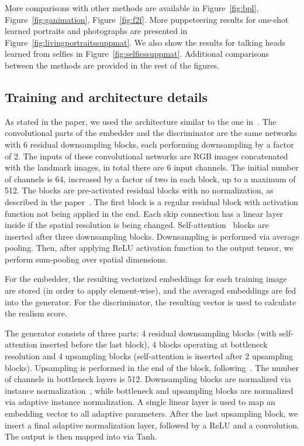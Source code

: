 \documentclass[10pt,twocolumn,letterpaper]{article}
\newcommand{\fig}[1]{Figure~\ref{fig:#1}}
\begin{document}
More comparisons with other methods are available in \fig{bpl}, \fig{ganimation}, \fig{f2f}. More puppeteering results for one-shot learned portraits and photographs are presented in \fig{livingportraitssuppmat}. We also show the results for talking heads learned from selfies in \fig{selfiessuppmat}. Additional comparisons between the methods are provided in the rest of the figures.

\subsection{Training and architecture details}

As stated in the paper, we used the architecture similar to the one in~\cite{Brock18}. The convolutional parts of the embedder and the discriminator are the same networks with 6 residual downsampling blocks, each performing downsampling by a factor of 2. The inputs of these convolutional networks are RGB images concatenated with the landmark images, in total there are 6 input channels. The initial number of channels is 64, increased by a factor of two in each block, up to a maximum of 512. The blocks are pre-activated residual blocks with no normalization, as described in the paper~\cite{Brock18}. The first block is a regular residual block with activation function not being applied in the end. Each skip connection has a linear layer inside if the spatial resolution is being changed. Self-attention~\cite{Zhang18b} blocks are inserted after three downsampling blocks. Downsampling is performed via average pooling. Then, after applying ReLU activation function to the output tensor, we perform sum-pooling over spatial dimensions.

For the embedder, the resulting vectorized embeddings for each training image are stored (in order to apply  element-wise), and the averaged embeddings are fed into the generator. For the discriminator, the resulting vector is used to calculate the realism score.

The generator consists of three parts: 4 residual downsampling blocks (with self-attention inserted before the last block), 4 blocks operating at bottleneck resolution and 4 upsampling blocks (self-attention is inserted after 2 upsampling blocks). Upsampling is performed in the end of the block, following~\cite{Brock18}. The number of channels in bottleneck layers is 512. Downsampling blocks are normalized via instance normalization~\cite{Ulyanov16}, while bottleneck and upsampling blocks are normalized via adaptive instance normalization. A single linear layer is used to map an embedding vector to all adaptive parameters. After the last upsampling block, we insert a final adaptive normalization layer, followed by a ReLU and a convolution. The output is then mapped into  via Tanh.
\end{document}

